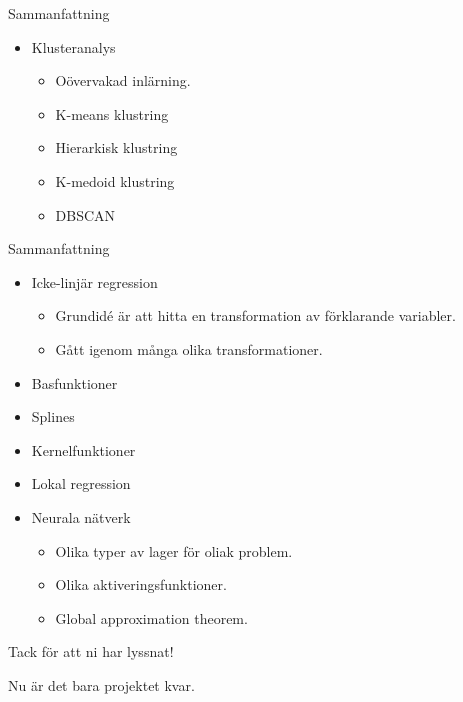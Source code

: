\documentclass[10pt,english]{beamer}
\begin{document}
\begin{frame}{Sammanfattning}
    
    \begin{itemize}
        \item Klusteranalys
        \begin{itemize}
            \item Oövervakad inlärning.
            \item K-means klustring
            \item Hierarkisk klustring
            \item K-medoid klustring
            \item DBSCAN
        \end{itemize}
    \end{itemize}

\end{frame}

\begin{frame}{Sammanfattning}
    
    \begin{itemize}
        \item Icke-linjär regression
        \begin{itemize}
            \item Grundidé är att hitta en transformation av förklarande variabler.
            \item Gått igenom många olika transformationer.
        \end{itemize}
        \item Basfunktioner
        \item Splines
        \item Kernelfunktioner
        \item Lokal regression
        \item Neurala nätverk
        \begin{itemize}
            \item Olika typer av lager för oliak problem.
            \item Olika aktiveringsfunktioner.
            \item Global approximation theorem.
        \end{itemize}
    \end{itemize}

\end{frame}

\begin{frame}[standout]
    \Huge Tack för att ni har lyssnat!

    \large Nu är det bara projektet kvar.
\end{frame}
\end{document}
